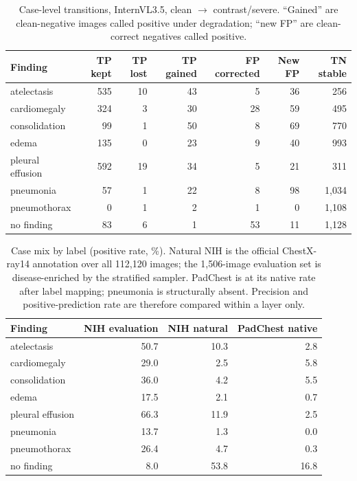 \begin{table}[H]
\centering
\small
\caption{Case-level transitions, InternVL3.5, clean $\rightarrow$ contrast/severe. ``Gained'' are clean-negative images called positive under degradation; ``new FP'' are clean-correct negatives called positive.}
\label{tab:flip}
\begin{tabular}{lrrrrrr}
\toprule
Finding & TP kept & TP lost & TP gained & FP corrected & New FP & TN stable \\
\midrule
atelectasis & 535 & 10 & 43 & 5 & 36 & 256 \\
cardiomegaly & 324 & 3 & 30 & 28 & 59 & 495 \\
consolidation & 99 & 1 & 50 & 8 & 69 & 770 \\
edema & 135 & 0 & 23 & 9 & 40 & 993 \\
pleural effusion & 592 & 19 & 34 & 5 & 21 & 311 \\
pneumonia & 57 & 1 & 22 & 8 & 98 & 1,034 \\
pneumothorax & 0 & 1 & 2 & 1 & 0 & 1,108 \\
no finding & 83 & 6 & 1 & 53 & 11 & 1,128 \\
\bottomrule
\end{tabular}
\end{table}

\begin{table}[H]
\centering
\small
\caption{Case mix by label (positive rate, \%). Natural NIH is the official ChestX-ray14 annotation over all 112,120 images; the 1,506-image evaluation set is disease-enriched by the stratified sampler. PadChest is at its native rate after label mapping; pneumonia is structurally absent. Precision and positive-prediction rate are therefore compared within a layer only.}
\label{tab:prevalence}
\begin{tabular}{lrrr}
\toprule
Finding & NIH evaluation & NIH natural & PadChest native \\
\midrule
atelectasis & 50.7 & 10.3 & 2.8 \\
cardiomegaly & 29.0 & 2.5 & 5.8 \\
consolidation & 36.0 & 4.2 & 5.5 \\
edema & 17.5 & 2.1 & 0.7 \\
pleural effusion & 66.3 & 11.9 & 2.5 \\
pneumonia & 13.7 & 1.3 & 0.0 \\
pneumothorax & 26.4 & 4.7 & 0.3 \\
no finding & 8.0 & 53.8 & 16.8 \\
\bottomrule
\end{tabular}
\end{table}

